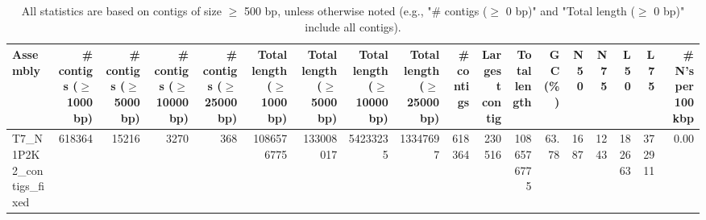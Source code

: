 \documentclass[12pt,a4paper]{article}
\begin{document}
\begin{table}[ht]
\begin{center}
\caption{All statistics are based on contigs of size $\geq$ 500 bp, unless otherwise noted (e.g., "\# contigs ($\geq$ 0 bp)" and "Total length ($\geq$ 0 bp)" include all contigs).}
\begin{tabular}{|l*{17}{|r}|}
\hline
Assembly & \# contigs ($\geq$ 1000 bp) & \# contigs ($\geq$ 5000 bp) & \# contigs ($\geq$ 10000 bp) & \# contigs ($\geq$ 25000 bp) & Total length ($\geq$ 1000 bp) & Total length ($\geq$ 5000 bp) & Total length ($\geq$ 10000 bp) & Total length ($\geq$ 25000 bp) & \# contigs & Largest contig & Total length & GC (\%) & N50 & N75 & L50 & L75 & \# N's per 100 kbp \\ \hline
T7\_N1P2K2\_contigs\_fixed & 618364 & 15216 & 3270 & 368 & 1086576775 & 133008017 & 54233235 & 13347697 & 618364 & 230516 & 1086576775 & 63.78 & 1687 & 1243 & 182663 & 372911 & 0.00 \\ \hline
\end{tabular}
\end{center}
\end{table}
\end{document}
